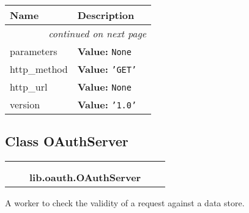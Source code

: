     \vspace{-1cm}
\hspace{\varindent}\begin{longtable}{|p{\varnamewidth}|p{\vardescrwidth}|l}
\cline{1-2}
\cline{1-2} \centering \textbf{Name} & \centering \textbf{Description}& \\
\cline{1-2}
\endhead\cline{1-2}\multicolumn{3}{r}{\small\textit{continued on next page}}\\\endfoot\cline{1-2}
\endlastfoot\raggedright p\-a\-r\-a\-m\-e\-t\-e\-r\-s\- & \raggedright \textbf{Value:} 
{\tt None}&\\
\cline{1-2}
\raggedright h\-t\-t\-p\-\_\-m\-e\-t\-h\-o\-d\- & \raggedright \textbf{Value:} 
{\tt \texttt{'}\texttt{GET}\texttt{'}}&\\
\cline{1-2}
\raggedright h\-t\-t\-p\-\_\-u\-r\-l\- & \raggedright \textbf{Value:} 
{\tt None}&\\
\cline{1-2}
\raggedright v\-e\-r\-s\-i\-o\-n\- & \raggedright \textbf{Value:} 
{\tt \texttt{'}\texttt{1.0}\texttt{'}}&\\
\cline{1-2}
\end{longtable}



\subsection{Class OAuthServer}

    \label{lib:oauth:OAuthServer}
\begin{tabular}{cccccc}
\multicolumn{2}{r}{\settowidth{\BCL}{object}\multirow{2}{\BCL}{object}}
&&
  \\\cline{3-3}
  &&\multicolumn{1}{c|}{}
&&
  \\
&&\multicolumn{2}{l}{\textbf{lib.oauth.OAuthServer}}
\end{tabular}

A worker to check the validity of a request against a data store.



